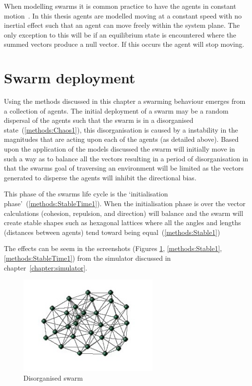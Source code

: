 When modelling swarms it is common practice to have the agents in constant motion~\cite{LCW:07, GKF:13}. In this thesis agents are modelled moving at a constant speed with no inertial effect such that an agent can move freely within the system plane. The only exception to this will be if an equilibrium state is encountered where the summed vectors produce a null vector. If this occurs the agent will stop moving.

\section{Swarm deployment}
Using the methods discussed in this chapter a swarming behaviour emerges from a collection of agents. The initial deployment of a swarm may be a random dispersal of the agents such that the swarm is in a disorganised state~(\autoref{methods:Chaos1}), this disorganisation is caused by a instability in the magnitudes that are acting upon each of the agents (as detailed above). Based upon the application of the models discussed the swarm will initially move in such a way as to balance all the vectors resulting in a period of disorganisation in that the swarms goal of traversing an environment will be limited as the vectors generated to disperse the agents will inhibit the directional bias. 

This phase of the swarms life cycle is the `initialisation phase'~(\autoref{methods:StableTime1}). When the initialisation phase is over the vector calculations (cohesion, repulsion, and direction) will balance and the swarm will create stable shapes such as hexagonal lattices where all the angles and lengths (distances between agents) tend toward being equal~(\autoref{methods:Stable1})

The effects can be seem in the screenshots (Figures \ref{methods:Chaos1}, \ref{methods:Stable1}, \ref{methods:StableTime1}) from the simulator discussed in chapter~\ref{chapter:simulator}.

\begin{figure}[H]
\begin{center}
\includegraphics[width=7cm]{CHAPTER-2/figures/Chaos}
\end{center}
\caption{Disorganised swarm\label{methods:Chaos1}}
\end{figure}

